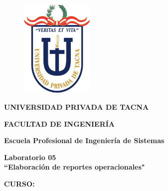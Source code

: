 \documentclass[12pt,letterpaper]{article}
\begin{document}
    \begin{titlepage}
        \begin{center}
            \begin{figure}[htb]
                \begin{center}
                    \includegraphics[width=3.5cm]{./img/logo}
                \end{center}
            \end{figure}
            \vspace*{0.15in}
            \begin{Large}
                \textbf{UNIVERSIDAD PRIVADA DE TACNA}\\
            \end{Large}
            \vspace*{0.15in}
            \begin{Large}
                \textbf{FACULTAD DE INGENIERÍA} \\
            \end{Large}
            \vspace*{0.1in}
            \begin{Large}
                \textbf{Escuela Profesional de Ingeniería de Sistemas} \\
            \end{Large}
            \vspace*{0.3in}
            \begin{Large}
                \textbf{Laboratorio 05}\\
                \textbf{``Elaboración de reportes operacionales"}\\
            \end{Large}
            \vspace*{0.2in}
            \begin{Large}
                \textbf{CURSO:} \\
            \end{Large}
            \vspace*{0.1in}
            \begin{large}

\end{large}
\end{center}
\end{titlepage}
\end{document}

